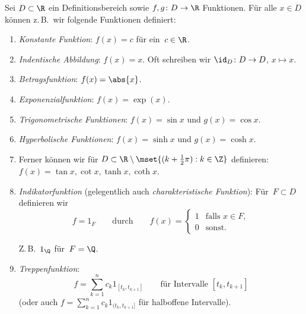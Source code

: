 \documentclass[a4paper]{article}
\begin{document}
\begin{example}
    Sei $D \subset \R$ ein Definitionsbereich sowie $f,g\colon D \to \R$ Funktionen. Für alle $x \in D$ können z.\,B.\ wir folgende Funktionen definiert:
    \begin{enumerate}
        \item \emph{Konstante Funktion}: $f(x) = c$ für ein~$c \in \R$.
        \item \emph{Indentische Abbildung}: $f(x) = x$. Oft schreiben wir $\id_D\colon D \to D$, $x \mapsto x$.
        \item \emph{Betragsfunktion}: $f(x) = \abs{x}$.
        \item \emph{Exponenzialfunktion}: $f(x) = \exp(x)$.
        \item \emph{Trigonometrische Funktionen}: $f(x) = \sin x$ und $g(x) = \cos x$.
        \item \emph{Hyperbolische Funktionen}: $f(x) = \sinh x$ und $g(x) = \cosh x$.
        \item Ferner können wir für $D \subset \R \setminus \mset{(k+\frac{1}{2}\pi) : k \in \Z}$ definieren: $f(x) = \tan x, \cot x, \tanh x, \coth x$.
        \item \emph{Indikatorfunktion} (gelegentlich auch \emph{charakteristische Funktion}): Für~$F \subset D$ definieren wir
              \begin{equation*}
                  f = 1_F \qquad\text{durch}\qquad f(x) =
                  \begin{cases}
                      1 & \text{falls } x \in F, \\
                      0 & \text{sonst}.
                  \end{cases}
              \end{equation*}
              \begin{center}
              \end{center}
              Z.\,B.~$1_\Q$ für~$F = \Q$.
        \item \emph{Treppenfunktion}:
              \begin{equation*}
                  f = \sum_{k=1}^n c_k 1_{[t_k,t_{k+1}]} \qquad\text{für Intervalle } [t_k,t_{k+1}]
              \end{equation*}
              (oder auch $f = \sum_{k=1}^n c_k 1_{(t_k,t_{k+1}]}$ für halboffene Intervalle).
              \begin{center}
\end{center}
\end{enumerate}
\end{example}
\end{document}
